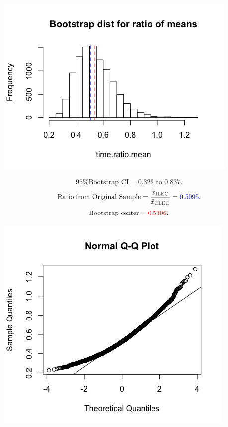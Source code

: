 \begin{multicols}{2}

\begin{center}
\includegraphics[width=0.4\tw]{13/fig-verizon-ratio.png}
\end{center}

\[ \mbox{95\% Bootstrap CI} = 0.328 \mbox{ to } 0.837.\]
\[ \mbox{Ratio from Original Sample} = \frac{\bar{x}_{\rm{ILEC}}}{\bar{x}_{\rm{CLEC}}} = \textcolor{blue}{0.5095}.\]
\[ \mbox{Bootstrap center}  = \textcolor{red}{0.5396}.\]

\columnbreak

\begin{center}
\includegraphics[width=0.4\tw]{13/fig-verizon-qq.png}
\end{center}

\end{multicols}


